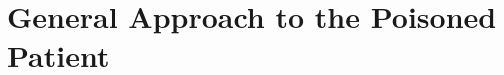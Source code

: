 \section{General Approach to the Poisoned Patient}








\label{sec:General Approach to the Poisoned Patient}

